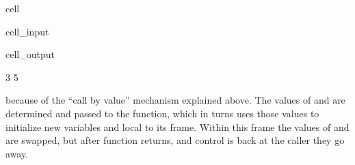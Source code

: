 \documentclass[a4paper,10pt,english]{jupyterBook}
\begin{document}
\begin{sphinxuseclass}{cell}\begin{sphinxVerbatimInput}

\begin{sphinxuseclass}{cell_input}
\begin{sphinxVerbatim}[commandchars=\\\{\}]

\end{sphinxVerbatim}

\end{sphinxuseclass}\end{sphinxVerbatimInput}
\begin{sphinxVerbatimOutput}

\begin{sphinxuseclass}{cell_output}
\begin{sphinxVerbatim}[commandchars=\\\{\}]
3 5
\end{sphinxVerbatim}

\end{sphinxuseclass}\end{sphinxVerbatimOutput}

\end{sphinxuseclass}
\sphinxAtStartPar
because of the “call by value” mechanism explained above. The values of  and  are determined and passed to the function, which in turns uses those values to initialize new variables  and  local to its frame. Within this frame the values of  and  are swapped, but after function returns, and control is back at the caller they go away.
\end{document}
